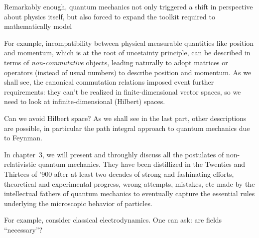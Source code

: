 \begin{refsection}
Remarkably enough, quantum mechanics not only triggered a shift in perspective about physics itself, but also forced to expand the toolkit required to mathematically model


For example, incompatibility between physical measurable quantities like position and
momentum, which is at the root of uncetainty principle, can be described in
terms of \emph{non-commutative} objects, leading naturally to adopt matrices or
operators (instead of usual numbers) to describe position and momentum.
As we shall see, the canonical commutation relations imposed event further
requirements: they can't be realized in finite-dimensional vector spaces,
so we need to look at infinite-dimensional (Hilbert) spaces. 

Can we avoid Hilbert space?
As we shall see in the last part, other descriptions are possible, in
particular the path integral approach to quantum mechanics due to Feynman. 

In chapter~3, we will present and throughly discuss  all the postulates of  
non-relativistic quantum
mechanics. 
They have been distillized in the Twenties and Thirtees of '900 after  at least two
decades of strong and fashinating efforts, 
theoretical and experimental progress, wrong
attempts, mistakes, etc 
made by the intellectual fathers of quantum mechanics 
to eventually capture the essential  rules underlying 
the microscopic behavior of particles.

For example, consider classical electrodynamics. 
One can ask: are fields ``necessary''?






\end{refsection}
